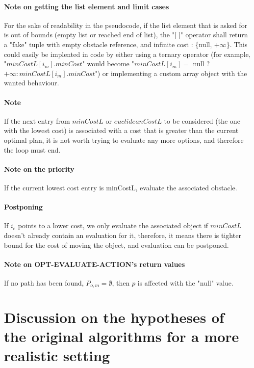 \paragraph{Note on getting the list element and limit cases}\label{get_list_element_note} For the sake of readability in the pseudocode, if the list element that is asked for is out of bounds (empty list or reached end of list), the "[ ]" operator shall return a "fake" tuple with empty obstacle reference, and infinite cost : \{null, $+\infty$\}. This could easily be implented in code by either using a ternary operator (for example, "$minCostL[i_{m}].minCost$" would become "$minCostL[i_{m}] =$ null ? $+\infty : minCostL[i_{m}].minCost$") or implementing a custom array object with the wanted behaviour.

\paragraph{Note}\label{list_traversal_note} If the next entry from $minCostL$ or $euclideanCostL$ to be considered (the one with the lowest cost) is associated with a cost that is greater than the current optimal plan, it is not worth trying to evaluate any more options, and therefore the loop must end.

\paragraph{Note on the priority}\label{minCostL_priority_note}If the current lowest cost entry is minCostL, evaluate the associated obstacle.

\paragraph{Postponing}\label{postponing_note} If $i_{e}$ points to a lower cost, we only evaluate the associated object if $minCostL$ doesn't already contain an evaluation for it, therefore, it means there is tighter bound for the cost of moving the object, and evaluation can be postponed.

\paragraph{Note on OPT-EVALUATE-ACTION's return values}\label{opt_return_note} If no path has been found, $P_{o,m} = \emptyset$, then $p$ is affected with the "null" value.




\section{Discussion on the hypotheses of the original algorithms for a more realistic setting}
